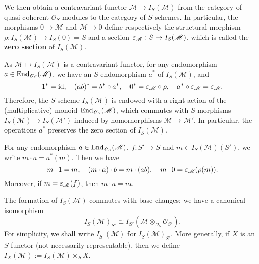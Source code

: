 We then obtain a contravariant functor $\mathscr{M}\mapsto I_S(\mathscr{M})$ from the category of quasi-coherent $\mathscr{O}_S$-modules to the category of $S$-schemes. In particular, the morphisms $0\to\mathscr{M}$ and $\mathscr{M}\to 0$ define respectively the structural morphism $\rho:I_S(\mathscr{M})\to I_S(0)=S$ and a section $\varepsilon_\mathscr{M}:S\to I_S(\mathscr{M})$, which is called the \textbf{zero section} of $I_S(\mathscr{M})$.\par

As $\mathscr{M}\mapsto I_S(\mathscr{M})$ is a contravariant functor, for any endomorphism $a\in\mathrm{End}_{\mathscr{O}_S}(\mathscr{M})$, we have an $S$-endomorphism $a^*$ of $I_S(\mathscr{M})$, and
\[1^*=\operatorname{id},\quad (ab)^*=b^*\circ a^*,\quad 0^*=\varepsilon_\mathscr{M}\circ\rho,\quad a^*\circ\varepsilon_\mathscr{M}=\varepsilon_\mathscr{M}.\]
Therefore, the $S$-scheme $I_S(\mathscr{M})$ is endowed with a right action of the (multiplicative) monoid $\mathrm{End}_{\mathscr{O}_S}(\mathscr{M})$, which commutes with $S$-morphisms $I_S(\mathscr{M})\to I_S(\mathscr{M}')$ induced by homomorphisms $\mathscr{M}\to\mathscr{M}'$. In particular, the operations $a^*$ preserves the zero section of $I_S(\mathscr{M})$.\par
For any endomorphism $a\in\mathrm{End}_{\mathscr{O}_S}(\mathscr{M})$, $f:S'\to S$ and $m\in I_S(\mathscr{M})(S')$, we write $m\cdot a=a^*(m)$. Then we have
\[m\cdot 1=m,\quad (m\cdot a)\cdot b=m\cdot(ab),\quad m\cdot 0=\varepsilon_\mathscr{M}(\rho(m)).\]
Moreover, if $m=\varepsilon_\mathscr{M}(f)$, then $m\cdot a=m$.

\begin{remark}
The formation of $I_S(\mathscr{M})$ commutes with base changes: we have a canonical isomorphism
\[I_S(\mathscr{M})_{S'}\cong I_{S'}(\mathscr{M}\otimes_{\mathscr{O}_S}\mathscr{O}_{S'}).\]
For simplicity, we shall write $I_{S'}(\mathscr{M})$ for $I_S(\mathscr{M})_{S'}$. More generally, if $X$ is an $S$-functor (not necessarily representable), then we define $I_X(\mathscr{M}):=I_S(\mathscr{M})\times_SX$.
\end{remark}

